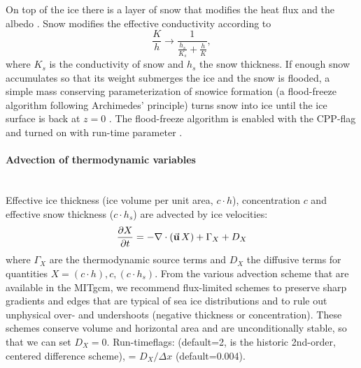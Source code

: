 On top of the ice there is a layer of snow that modifies the heat flux
and the albedo \citep{zha98a}. Snow modifies the effective
conductivity according to 
\[\frac{K}{h} \rightarrow \frac{1}{\frac{h_{s}}{K_{s}}+\frac{h}{K}},\]
where $K_s$ is the conductivity of snow and $h_s$ the snow thickness.
If enough snow accumulates so that its weight submerges the ice and
the snow is flooded, a simple mass conserving parameterization of
snowice formation (a flood-freeze algorithm following Archimedes'
principle) turns snow into ice until the ice surface is back at $z=0$
\citep{leppaeranta83}. The flood-freeze algorithm is enabled with the CPP-flag
 and turned on with run-time parameter
.

\paragraph{Advection of thermodynamic variables\label{sec:pkg:seaice:advection}}~\\
%
Effective ice thickness (ice volume per unit area,
$c\cdot{h}$), concentration $c$ and effective snow thickness
($c\cdot{h}_{s}$) are advected by ice velocities:
\begin{equation}
  \label{eq:advection}
  \frac{\partial{X}}{\partial{t}} = - \nabla\cdot\left(\vek{u}\,X\right) +
  \Gamma_{X} + D_{X}
\end{equation}
where $\Gamma_X$ are the thermodynamic source terms and $D_{X}$ the
diffusive terms for quantities $X=(c\cdot{h}), c, (c\cdot{h}_{s})$.
%
From the various advection scheme that are available in the MITgcm, we
recommend flux-limited schemes \citep[multidimensional 2nd and
3rd-order advection scheme with flux limiter][]{roe:85, hundsdorfer94}
to preserve sharp gradients and edges that are typical of sea ice
distributions and to rule out unphysical over- and undershoots
(negative thickness or concentration). These schemes conserve volume
and horizontal area and are unconditionally stable, so that we can set
$D_{X}=0$. Run-timeflags:  (default=2, is the
historic 2nd-order, centered difference scheme),  =
$D_{X}/\Delta{x}$
(default=0.004).

